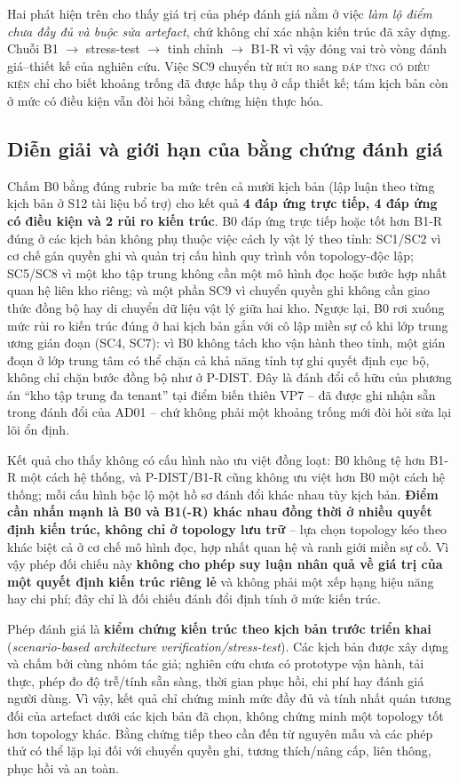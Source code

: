 Hai phát hiện trên cho thấy giá trị của phép đánh giá nằm ở việc \emph{làm lộ điểm chưa đầy đủ và buộc sửa artefact}, chứ không chỉ xác nhận kiến trúc đã xây dựng. Chuỗi B1 $\rightarrow$ stress-test $\rightarrow$ tinh chỉnh $\rightarrow$ B1-R vì vậy đóng vai trò vòng đánh giá--thiết kế của nghiên cứu. Việc SC9 chuyển từ \textsc{rủi ro} sang \textsc{đáp ứng có điều kiện} chỉ cho biết khoảng trống đã được hấp thụ ở cấp thiết kế; tám kịch bản còn ở mức có điều kiện vẫn đòi hỏi bằng chứng hiện thực hóa.

\subsection{Diễn giải và giới hạn của bằng chứng đánh giá}
\label{subsec:eval-limitations}

Chấm B0 bằng đúng rubric ba mức trên cả mười kịch bản (lập luận theo từng kịch bản ở S12 tài liệu bổ trợ) cho kết quả \textbf{4 đáp ứng trực tiếp, 4 đáp ứng có điều kiện và 2 rủi ro kiến trúc}. B0 đáp ứng trực tiếp hoặc tốt hơn B1-R đúng ở các kịch bản không phụ thuộc việc cách ly vật lý theo tỉnh: SC1/SC2 vì cơ chế gán quyền ghi và quản trị cấu hình quy trình vốn topology-độc lập; SC5/SC8 vì một kho tập trung không cần một mô hình đọc hoặc bước hợp nhất quan hệ liên kho riêng; và một phần SC9 vì chuyển quyền ghi không cần giao thức đồng bộ hay di chuyển dữ liệu vật lý giữa hai kho. Ngược lại, B0 rơi xuống mức rủi ro kiến trúc đúng ở hai kịch bản gắn với cô lập miền sự cố khi lớp trung ương gián đoạn (SC4, SC7): vì B0 không tách kho vận hành theo tỉnh, một gián đoạn ở lớp trung tâm có thể chặn cả khả năng tỉnh tự ghi quyết định cục bộ, không chỉ chặn bước đồng bộ như ở P-DIST. Đây là đánh đổi cố hữu của phương án ``kho tập trung đa tenant'' tại điểm biến thiên VP7 -- đã được ghi nhận sẵn trong đánh đổi của AD01 -- chứ không phải một khoảng trống mới đòi hỏi sửa lại lõi ổn định.

Kết quả cho thấy không có cấu hình nào ưu việt đồng loạt: B0 không tệ hơn B1-R một cách hệ thống, và P-DIST/B1-R cũng không ưu việt hơn B0 một cách hệ thống; mỗi cấu hình bộc lộ một hồ sơ đánh đổi khác nhau tùy kịch bản. \textbf{Điểm cần nhấn mạnh là B0 và B1(-R) khác nhau đồng thời ở nhiều quyết định kiến trúc, không chỉ ở topology lưu trữ} -- lựa chọn topology kéo theo khác biệt cả ở cơ chế mô hình đọc, hợp nhất quan hệ và ranh giới miền sự cố. Vì vậy phép đối chiếu này \textbf{không cho phép suy luận nhân quả về giá trị của một quyết định kiến trúc riêng lẻ} và không phải một xếp hạng hiệu năng hay chi phí; đây chỉ là đối chiếu đánh đổi định tính ở mức kiến trúc.

Phép đánh giá là \textbf{kiểm chứng kiến trúc theo kịch bản trước triển khai} (\textit{scenario-based architecture verification/stress-test}). Các kịch bản được xây dựng và chấm bởi cùng nhóm tác giả; nghiên cứu chưa có prototype vận hành, tải thực, phép đo độ trễ/tính sẵn sàng, thời gian phục hồi, chi phí hay đánh giá người dùng. Vì vậy, kết quả chỉ chứng minh mức đầy đủ và tính nhất quán tương đối của artefact dưới các kịch bản đã chọn, không chứng minh một topology tốt hơn topology khác. Bằng chứng tiếp theo cần đến từ nguyên mẫu và các phép thử có thể lặp lại đối với chuyển quyền ghi, tương thích/nâng cấp, liên thông, phục hồi và an toàn.
